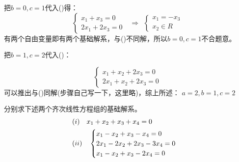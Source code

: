 \documentclass[a4paper]{report}
\begin{document}
\begin{jie}
把$b=0,c=1$代入(\uppercase\expandafter{})得：
\begin{equation*}
\begin{cases}
x_1+x_3=0\\
2x_1+2x_3=0
\end{cases}~~~\Rightarrow~~\begin{cases}
                             x_1=-x_3\\
                             x_2\in R
                           \end{cases}
\end{equation*}
有两个自由变量即有两个基础解系，与(\uppercase\expandafter{})不同解，所以$b=0,c=1$不合题意。

把$b=1,c=2$代入(\uppercase\expandafter{})：

\begin{equation*}
\begin{cases}
x_1+x_2+2x_3=0\\
2x_1+x_2+2x_3=0
\end{cases}
\end{equation*}
可以推出与(\uppercase\expandafter{})同解(步骤自己写一下，这里略)，综上所述：
$a=2,b=1,c=2$
\end{jie}

\EX 分别求下述两个齐次线性方程组的基础解系。
\begin{align*}
&(\uppercase\expandafter{\romannumeral1})~~~ x_1+x_2+x_3+x_4=0\\
&(\uppercase\expandafter{\romannumeral2}) ~~~
\begin{cases}
x_1-x_2+x_3-x_4=0\\
2x_1-2x_2+2x_3-3x_4=0\\
x_1-x_2+x_3-2x_4=0
\end{cases}
\end{align*}
\end{document}
